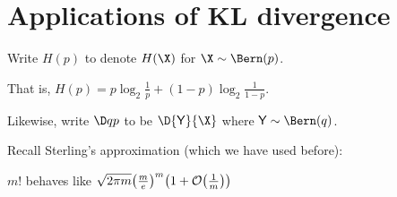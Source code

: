 \documentclass[class=co432,notes,tikz]{agony}
\begin{document}
\chapter{Applications of KL divergence}

\begin{notation}
  Write $H(p)$ to denote $H(\X)$ for $\X \sim \Bern(p)$.

  That is, $H(p) = p\log_2\frac1p + (1-p)\log_2\frac{1}{1-p}$.

  Likewise, write $\D q p$ to be $\D{\rv Y}{\X}$
  where $\rv Y \sim \Bern(q)$.
\end{notation}

Recall Sterling's approximation (which we have used before):

\begin{theorem}\label{thm:sterling}
  $m!$ behaves like $\sqrt{2\pi m}\qty(\frac{m}{e})^m\qty(1+\order{\frac{1}{m}})$
\end{theorem}
\end{document}
